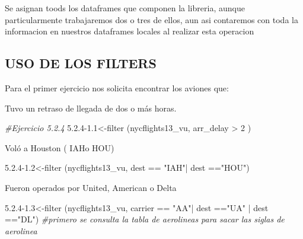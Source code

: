 \documentclass[
]{article}
\newenvironment{Shaded}{\begin{snugshade}}{\end{snugshade}}
\newcommand{\CommentTok}[1]{\textcolor[rgb]{0.56,0.35,0.01}{\textit{#1}}}
\newcommand{\FunctionTok}[1]{\textcolor[rgb]{0.00,0.00,0.00}{#1}}
\newcommand{\NormalTok}[1]{#1}
\newcommand{\OtherTok}[1]{\textcolor[rgb]{0.56,0.35,0.01}{#1}}
\newcommand{\SpecialCharTok}[1]{\textcolor[rgb]{0.00,0.00,0.00}{#1}}
\newcommand{\StringTok}[1]{\textcolor[rgb]{0.31,0.60,0.02}{#1}}
\begin{document}
Se asignan toods los dataframes que componen la libreria, aunque
particularmente trabajaremos dos o tres de ellos, aun asi contaremos con
toda la informacion en nuestros dataframes locales al realizar esta
operacion

\hypertarget{uso-de-los-filters}{%
\subsection{USO DE LOS FILTERS}\label{uso-de-los-filters}}

Para el primer ejercicio nos solicita encontrar los aviones que:

Tuvo un retraso de llegada de dos o más horas.

\begin{Shaded}
\begin{Highlighting}[]
\CommentTok{\#Ejercicio 5.2.4}
\StringTok{\textquotesingle{}5.2.4{-}1.1\textquotesingle{}}\OtherTok{\textless{}{-}}\FunctionTok{filter}\NormalTok{ (nycflights13\_vu, arr\_delay }\SpecialCharTok{\textgreater{}} \StringTok{\textquotesingle{}2\textquotesingle{}}\NormalTok{ )}
\end{Highlighting}
\end{Shaded}

Voló a Houston ( IAHo HOU)

\begin{Shaded}
\begin{Highlighting}[]
\StringTok{\textquotesingle{}5.2.4{-}1.2\textquotesingle{}}\OtherTok{\textless{}{-}}\FunctionTok{filter}\NormalTok{ (nycflights13\_vu, dest }\SpecialCharTok{==} \StringTok{"IAH"}\SpecialCharTok{|}\NormalTok{ dest }\SpecialCharTok{==}\StringTok{"HOU"}\NormalTok{)}
\end{Highlighting}
\end{Shaded}

Fueron operados por United, American o Delta

\begin{Shaded}
\begin{Highlighting}[]
\StringTok{\textquotesingle{}5.2.4{-}1.3\textquotesingle{}}\OtherTok{\textless{}{-}}\FunctionTok{filter}\NormalTok{ (nycflights13\_vu, carrier }\SpecialCharTok{==} \StringTok{"AA"}\SpecialCharTok{|}\NormalTok{ dest }\SpecialCharTok{==}\StringTok{"UA"} \SpecialCharTok{|}\NormalTok{ dest }\SpecialCharTok{==}\StringTok{"DL"}\NormalTok{) }\CommentTok{\#primero se consulta la tabla de aerolineas para sacar las siglas de aerolinea}
\end{Highlighting}
\end{Shaded}
\end{document}
